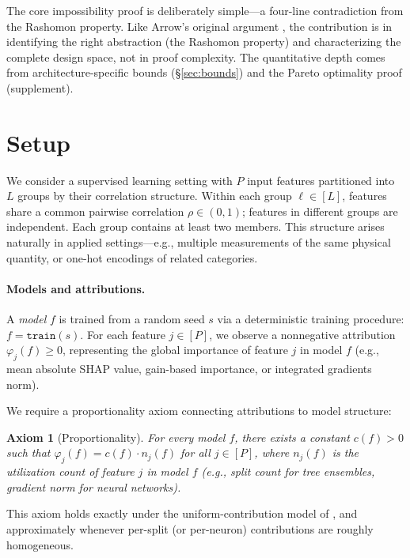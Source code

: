 \documentclass{article}
\newtheorem{axiom}{Axiom}
\begin{document}
The core impossibility proof is deliberately simple---a four-line contradiction from the Rashomon property.
Like Arrow's original argument \citep{arrow1951social}, the contribution is in identifying the right abstraction (the Rashomon property) and characterizing the complete design space, not in proof complexity.
The quantitative depth comes from architecture-specific bounds (\S\ref{sec:bounds}) and the Pareto optimality proof (supplement).

\section{Setup}
\label{sec:setup}

We consider a supervised learning setting with $P$ input features partitioned into $L$ groups by their correlation structure.
Within each group $\ell \in [L]$, features share a common pairwise correlation $\rho \in (0,1)$; features in different groups are independent.
Each group contains at least two members.
This structure arises naturally in applied settings---e.g., multiple measurements of the same physical quantity, or one-hot encodings of related categories.

\paragraph{Models and attributions.}
A \emph{model} $f$ is trained from a random seed $s$ via a deterministic training procedure: $f = \texttt{train}(s)$.
For each feature $j \in [P]$, we observe a nonneg\-ative attribution $\varphi_j(f) \geq 0$, representing the global importance of feature $j$ in model $f$ (e.g., mean absolute SHAP value, gain-based importance, or integrated gradients norm).

We require a proportionality axiom connecting attributions to model structure:

\begin{axiom}[Proportionality]
\label{ax:proportional}
For every model $f$, there exists a constant $c(f) > 0$ such that $\varphi_j(f) = c(f) \cdot n_j(f)$ for all $j \in [P]$, where $n_j(f)$ is the utilization count of feature $j$ in model $f$ (e.g., split count for tree ensembles, gradient norm for neural networks).
\end{axiom}

This axiom holds exactly under the uniform-contribution model of \citet{lundberg2017unified}, and approximately whenever per-split (or per-neuron) contributions are roughly homogeneous.
\end{document}
